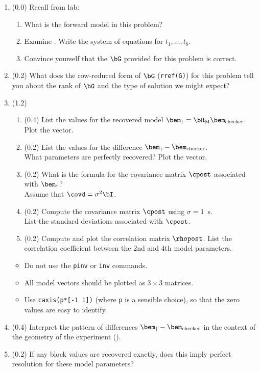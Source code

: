 \documentclass[11pt,titlepage,fleqn]{article}
\begin{document}

\begin{enumerate}

\item (0.0) Recall from lab:
%
\begin{enumerate}
\item What is the forward model in this problem?
\item Examine . Write the system of equations for $t_1, \ldots, t_8$.
\item Convince yourself that the $\bG$ provided for this problem is correct.
\end{enumerate}

\item (0.2) What does the row-reduced form of $\bG$ (\verb+rref(G)+) for this problem tell you about the rank of $\bG$ and the type of solution we might expect?

\item (1.2) 
\begin{enumerate}
\item (0.4) List the values for the recovered model $\bem_{\dagger} = \bR_{\rm M}\bem_{\rm checker}$. Plot the vector.
\item (0.2) List the values for the difference $\bem_{\dagger}-\bem_{\rm checker}$. \\
What parameters are perfectly recovered? Plot the vector.
\item (0.2) What is the formula for the covariance matrix $\cpost$ associated with $\bem_{\dagger}$? \\ Assume that $\covd = \sigma^2\bI$.
\item (0.2) Compute the covariance matrix $\cpost$ using $\sigma = 1$~s. \\
List the standard deviations associated with $\cpost$.
\item (0.2) Compute and plot the correlation matrix $\rhopost$. List the correlation coefficient between the 2nd and 4th model parameters.
\end{enumerate}

\begin{itemize}
\item Do not use the \verb+pinv+ or \verb+inv+ commands.
\item All model vectors should be plotted as $3 \times 3$ matrices.
\item Use \verb+caxis(p*[-1 1])+ (where \verb+p+ is a sensible choice), so that the zero values are easy to identify.
\end{itemize}

\item (0.4) Interpret the pattern of differences $\bem_{\dagger}-\bem_{\rm checker}$ in the context of the geometry of the experiment ().

\item (0.2) If any block values are recovered exactly, does this imply perfect resolution for these model parameters?
\end{enumerate}
\end{document}
